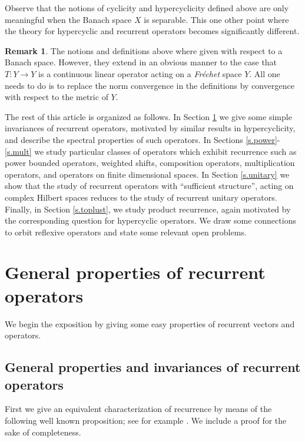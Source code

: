 \documentclass[12pt,leqno]{amsart}
\theoremstyle{plain}
\theoremstyle{definition}
\newtheorem{remark}[equation]{Remark}
\numberwithin{equation}{section}
\begin{document}
Observe that the notions of cyclicity and hypercyclicity defined above are only meaningful when the Banach space $X$ is separable. This one other point where the theory for hypercyclic and recurrent operators becomes significantly different.

\begin{remark} The notions and definitions above where given with respect to a Banach space. However, they extend in an obvious manner to the case that $T:Y\to Y$ is a continuous linear operator acting on a \emph{Fr\'echet} space $Y$. All one needs to do is to replace the norm convergence in the definitions by convergence with respect to the metric of $Y$.
\end{remark}

The rest of this article is organized as follows. In Section \ref{s.general} we give some simple invariances of recurrent operators, motivated by similar results in hypercyclicity, and describe the spectral properties of such operators. In Sections \ref{s.power}-\ref{s.mult} we study particular classes of operators which exhibit recurrence such as power bounded operators, weighted shifts, composition operators, multiplication operators, and operators on finite dimensional spaces. In Section \ref{s.unitary} we show that the study of recurrent operators with ``sufficient structure'', acting on complex Hilbert spaces reduces to the study of recurrent unitary operators. Finally, in Section \ref{s.toplust}, we study product recurrence, again motivated by the corresponding question for hypercyclic operators. We draw some connections to orbit reflexive operators and state some relevant open problems.

\section{General properties of recurrent operators}\label{s.general} We begin the exposition by giving some easy properties of recurrent vectors and operators.

\subsection{General properties and invariances of recurrent operators} First we give an equivalent characterization of recurrence  by means of the following well known proposition; see for example \cite{Fur}. We include a proof for the sake of completeness.
\end{document}
